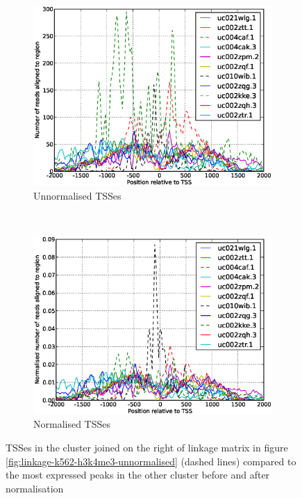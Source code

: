 \documentclass[10pt,a4paper]{article}
\begin{document}
\begin{figure}
\centering
\begin{subfigure}{0.45\textwidth}
	\includegraphics[width=\textwidth]{images/over-expressed-tsses.eps}
	\caption{Unnormalised TSSes}
	\label{fig:oversexpressed-tsses-unnormalised}
\end{subfigure}
~
\begin{subfigure}{0.45\textwidth}
	\includegraphics[width=\textwidth]{images/over-expressed-tsses-normalised.eps}
    \caption{Normalised TSSes}
    \label{fig:overexpressed-tsses-normalised}
\end{subfigure}
\caption{TSSes in the cluster joined on the right of linkage matrix in figure \ref{fig:linkage-k562-h3k4me3-unnormalised} (dashed lines) compared to the most expressed peaks in the other cluster before and after normalisation}
\label{fig:overexpressed-tsses}
\end{figure}
\end{document}
